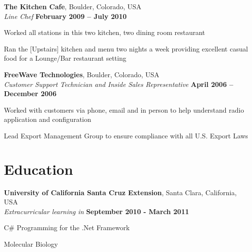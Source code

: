 \documentclass[margin,line]{resume}
\begin{document}
\begin{resume}
 \textbf{The Kitchen Cafe}, Boulder, Colorado, USA \vspace{1mm}\\\vspace{1mm}%
    \textsl{Line Chef} \hfill \textbf{February 2009 -- July 2010} \vspace{-3mm}\\\vspace{-1mm}%
	\begin{list2}
	\item Worked all stations in this two kitchen, two dining room restaurant
	\item Ran the [Upstairs] kitchen and menu two nights a week providing excellent casual food for a Lounge/Bar restaurant setting
	\end{list2}

    \textbf{FreeWave Technologies}, Boulder, Colorado, USA \vspace{1mm}\\\vspace{1mm}%
    \textsl{Customer Support Technician and Inside Sales Representative} \hfill \textbf{April 2006 -- December 2006} \vspace{-3mm}\\\vspace{-1mm}%
	\begin{list2}
	\item Worked with customers via phone, email and in person to help understand radio application and configuration
	\item Lead Export Management Group to ensure compliance with all U.S. Export Laws
	\end{list2}

    \section{\mysidestyle Education}

    \textbf{University of California Santa Cruz Extension}, Santa Clara, California, USA \vspace{1mm}\\\vspace{1mm}%
    \textsl{Extracurricular learning in} \hfill \textbf{September 2010 - March 2011}\vspace{-3mm}\\\vspace{-1mm}%
    \begin{list2}
        \item C\# Programming for the .Net Framework
        \item Molecular Biology	
    \end{list2}\vspace{-1.5mm}


\end{resume}
\end{document}
